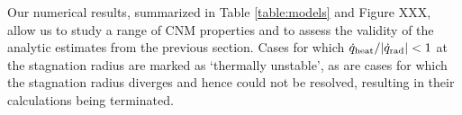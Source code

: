 \documentclass[usenatbib,fleqn]{mn2e}
\newcommand{\Mbh}[1][]{M_{\bullet#1}}
\begin{document}

Our numerical results, summarized in Table \ref{table:models} and Figure XXX, allow us to study a range of CNM properties and to assess the validity of the analytic estimates from the previous section.  Cases for which $\dot{q}_{\rm heat}/|\dot{q}_{\rm rad}|< 1$ at the stagnation radius are marked as `thermally unstable', as are cases for which the stagnation radius diverges and hence could not be resolved, resulting in their calculations being terminated.  
\end{document}
